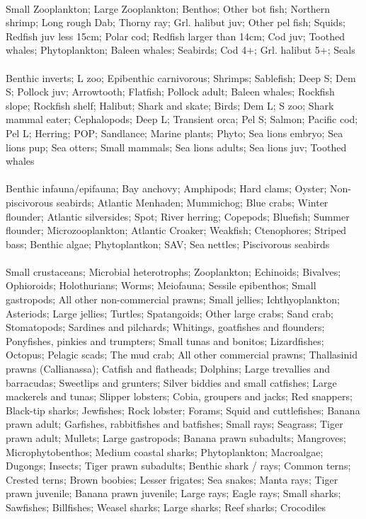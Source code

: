 \fullhline
\hline
{} \\
\hline
Small Zooplankton; Large Zooplankton; Benthos; Other bot fish; Northern shrimp; Long rough Dab; Thorny ray; Grl. halibut juv; Other pel fish; Squids; Redfish juv less 15cm; Polar cod; Redfish larger than 14cm; Cod juv; Toothed whales; Phytoplankton; Baleen whales; Seabirds; Cod 4+; Grl. halibut 5+; Seals\\
\fullhline
\hline
{} \\
\hline
Benthic inverts; L zoo; Epibenthic carnivorous; Shrimps; Sablefish; Deep S; Dem S; Pollock juv; Arrowtooth; Flatfish; Pollock adult; Baleen whales; Rockfish slope; Rockfish shelf; Halibut; Shark and skate; Birds; Dem L; S zoo; Shark mammal eater; Cephalopods; Deep L; Transient orca; Pel S; Salmon; Pacific cod; Pel L; Herring; POP; Sandlance; Marine plants; Phyto; Sea lions embryo; Sea lions pup; Sea otters; Small mammals; Sea lions adults; Sea lions juv; Toothed whales\\
\fullhline
\hline
{} \\
\hline
Benthic infauna/epifauna; Bay anchovy; Amphipods; Hard clams; Oyster; Non-piscivorous seabirds; Atlantic Menhaden; Mummichog; Blue crabs; Winter flounder; Atlantic silversides; Spot; River herring; Copepods; Bluefish; Summer flounder; Microzooplankton; Atlantic Croaker; Weakfish; Ctenophores; Striped bass; Benthic algae; Phytoplantkon; SAV; Sea nettles; Piscivorous seabirds\\
\fullhline
\hline
{} \\
\hline
Small crustaceans; Microbial heterotrophs; Zooplankton; Echinoids; Bivalves; Ophioroids; Holothurians; Worms; Meiofauna; Sessile epibenthos; Small gastropods; All other non-commercial prawns; Small jellies; Ichthyoplankton; Asteriods; Large jellies; Turtles; Spatangoids; Other large crabs; Sand crab; Stomatopods; Sardines and pilchards; Whitings, goatfishes and flounders; Ponyfishes, pinkies and trumpters; Small tunas and bonitos; Lizardfishes; Octopus; Pelagic scads; The mud crab; All other commercial prawns; Thallasinid prawns (Callianassa); Catfish and flatheads; Dolphins; Large trevallies and barracudas; Sweetlips and grunters; Silver biddies and small catfishes; Large mackerels and tunas; Slipper lobsters; Cobia, groupers and jacks; Red snappers; Black-tip sharks; Jewfishes; Rock lobster; Forams; Squid and cuttlefishes; Banana prawn adult; Garfishes, rabbitfishes and batfishes; Small rays; Seagrass; Tiger prawn adult; Mullets; Large gastropods; Banana prawn subadults; Mangroves; Microphytobenthos; Medium coastal sharks; Phytoplankton; Macroalgae; Dugongs; Insects; Tiger prawn subadults; Benthic shark / rays; Common terns; Crested terns; Brown boobies; Lesser frigates; Sea snakes; Manta rays; Tiger prawn juvenile; Banana prawn juvenile; Large rays; Eagle rays; Small sharks; Sawfishes; Billfishes; Weasel sharks; Large sharks; Reef sharks; Crocodiles\\
